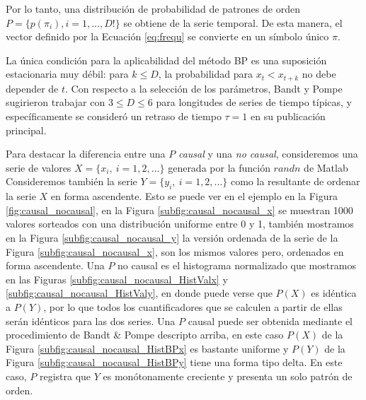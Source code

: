 Por lo tanto, una distribución de probabilidad de patrones de orden $P = \{ p(\pi_i), i = 1, \dots, D! \}$ se obtiene de la serie temporal.
De esta manera, el vector definido por la Ecuación \ref{eq:frequ} se convierte en un símbolo único $\pi$.

La única condición para la aplicabilidad del método BP es una suposición estacionaria muy débil: para $k \leq D$, la probabilidad para $x_t<x_{t + k}$ no debe depender de $t$.
Con respecto a la selección de los parámetros, Bandt y Pompe sugirieron trabajar con $3 \leq D \leq 6$ para longitudes de series de tiempo típicas, y específicamente se consideró un retraso de tiempo $\tau = 1$ en su publicación principal.

Para destacar la diferencia entre una $P$ \textit{causal} y una \textit{no causal}, consideremos una serie de valores $X=\{x_i,~i=1,2,...\}$ generada por la función $randn$ de Matlab
Consideremos también la serie $Y=\{y_i,~i=1,2,...\}$ como la resultante de ordenar la serie $X$ en forma ascendente. Esto se puede ver en el ejemplo en la Figura \ref{fig:causal_nocausal}, en la Figura \ref{subfig:causal_nocausal_x} se muestran 1000 valores sorteados con una distribución uniforme entre 0 y 1, también mostramos en la Figura \ref{subfig:causal_nocausal_y} la versión ordenada de la serie de la Figura \ref{subfig:causal_nocausal_x}, son los mismos valores pero, ordenados en forma ascendente. Una $P$ no causal es el histograma normalizado que mostramos en las Figuras \ref{subfig:causal_nocausal_HistValx} y \ref{subfig:causal_nocausal_HistValy}, en donde puede verse que $P(X)$ es idéntica a $P(Y)$, por lo que todos los cuantificadores que se calculen a partir de ellas serán idénticos para las dos series. Una $P$ causal puede ser obtenida mediante el procedimiento de Bandt \& Pompe descripto arriba, en este caso $P(X)$ de la Figura \ref{subfig:causal_nocausal_HistBPx} es bastante uniforme y $P(Y)$ de la Figura \ref{subfig:causal_nocausal_HistBPy} tiene una forma tipo delta. En este caso, $P$ registra que $Y$ es monótonamente creciente y presenta un solo patrón de orden.

